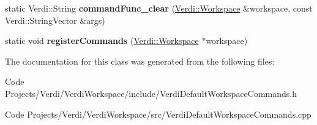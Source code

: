 \begin{DoxyCompactItemize}
\item 
\hypertarget{class_verdi_1_1_default_workspace_commands_ae28bbbf6bf88faab285e7ff6d93b403e}{static \-Verdi\-::\-String {\bfseries command\-Func\-\_\-clear} (\hyperlink{class_verdi_1_1_workspace}{\-Verdi\-::\-Workspace} \&workspace, const \-Verdi\-::\-String\-Vector \&args)}\label{class_verdi_1_1_default_workspace_commands_ae28bbbf6bf88faab285e7ff6d93b403e}

\item 
\hypertarget{class_verdi_1_1_default_workspace_commands_ae0fd6a6a5cc163dde0afa2249af15e98}{static void {\bfseries register\-Commands} (\hyperlink{class_verdi_1_1_workspace}{\-Verdi\-::\-Workspace} $\ast$workspace)}\label{class_verdi_1_1_default_workspace_commands_ae0fd6a6a5cc163dde0afa2249af15e98}

\end{DoxyCompactItemize}


\-The documentation for this class was generated from the following files\-:\begin{DoxyCompactItemize}
\item 
\-Code Projects/\-Verdi/\-Verdi\-Workspace/include/\-Verdi\-Default\-Workspace\-Commands.\-h\item 
\-Code Projects/\-Verdi/\-Verdi\-Workspace/src/\-Verdi\-Default\-Workspace\-Commands.\-cpp\end{DoxyCompactItemize}
